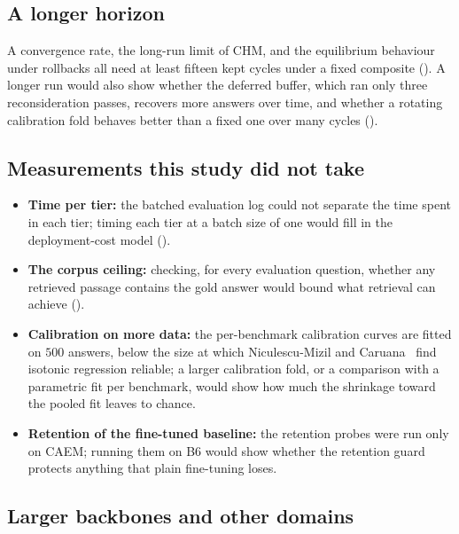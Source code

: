 \subsection{A longer horizon}
\label{sec:future-equilibrium-horizon}

A convergence rate, the long-run limit of CHM, and the equilibrium behaviour under rollbacks all need at least fifteen kept cycles under a fixed composite (). A longer run would also show whether the deferred buffer, which ran only three reconsideration passes, recovers more answers over time, and whether a rotating calibration fold behaves better than a fixed one over many cycles ().

\subsection{Measurements this study did not take}
\label{sec:future-latency}

\begin{itemize}
    \item \textbf{Time per tier:} the batched evaluation log could not separate the time spent in each tier; timing each tier at a batch size of one would fill in the deployment-cost model ().
    \item \textbf{The corpus ceiling:} checking, for every evaluation question, whether any retrieved passage contains the gold answer would bound what retrieval can achieve ().
    \item \textbf{Calibration on more data:} the per-benchmark calibration curves are fitted on $500$ answers, below the size at which Niculescu-Mizil and Caruana~\cite{niculescu2005predicting} find isotonic regression reliable; a larger calibration fold, or a comparison with a parametric fit per benchmark, would show how much the shrinkage toward the pooled fit leaves to chance.
    \item \textbf{Retention of the fine-tuned baseline:} the retention probes were run only on CAEM; running them on B6 would show whether the retention guard protects anything that plain fine-tuning loses.
\end{itemize}

\subsection{Larger backbones and other domains}
\label{sec:future-backbone}

